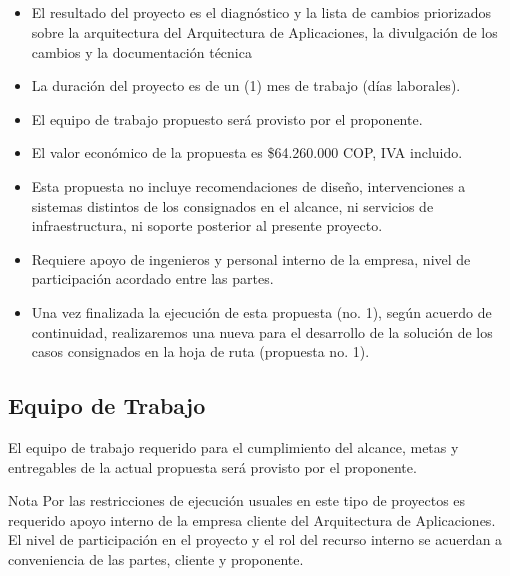 \documentclass[
	a4paper, %
	12pt, %
]{include/CSSullivanBusinessReport}
\def\tightlist{}
\begin{document}
\subsection{}\label{sec:section}

\begin{quote}
\end{quote}

\begin{itemize}
\tightlist
\item
  El resultado del proyecto es el diagnóstico y la lista de cambios
  priorizados sobre la arquitectura del Arquitectura de Aplicaciones, la
  divulgación de los cambios y la documentación técnica
\item
  La duración del proyecto es de un (1) mes de trabajo (días laborales).
\item
  El equipo de trabajo propuesto será provisto por el proponente.
\item
  El valor económico de la propuesta es \$64.260.000 COP, IVA incluido.
\item
  Esta propuesta no incluye recomendaciones de diseño, intervenciones a
  sistemas distintos de los consignados en el alcance, ni servicios de
  infraestructura, ni soporte posterior al presente proyecto.
\item
  Requiere apoyo de ingenieros y personal interno de la empresa, nivel
  de participación acordado entre las partes.
\item
  Una vez finalizada la ejecución de esta propuesta (no. 1), según
  acuerdo de continuidad, realizaremos una nueva para el desarrollo de
  la solución de los casos consignados en la hoja de ruta (propuesta no.
  1).
\end{itemize}

\subsection{Equipo de Trabajo}\label{sec:equipo-de-trabajo}

\begin{quote}
\end{quote}

El equipo de trabajo requerido para el cumplimiento del alcance, metas y
entregables de la actual propuesta será provisto por el proponente.

Nota Por las restricciones de ejecución usuales en este tipo de
proyectos es requerido apoyo interno de la empresa cliente del
Arquitectura de Aplicaciones. El nivel de participación en el proyecto y
el rol del recurso interno se acuerdan a conveniencia de las partes,
cliente y
proponente.
\end{document}
